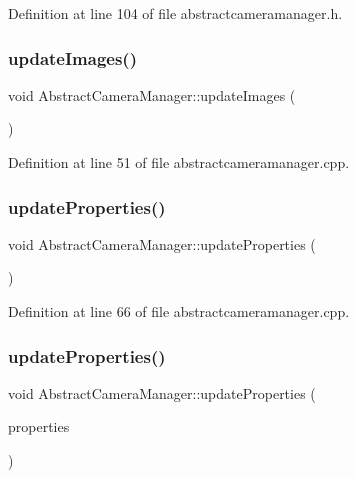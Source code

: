 Definition at line 104 of file abstractcameramanager.\+h.

\mbox{\label{class_abstract_camera_manager_a336e5cf760314194c1baf1234b87b247}} 
\subsubsection{\texorpdfstring{updateImages()}{updateImages()}}
{\footnotesize\ttfamily void Abstract\+Camera\+Manager\+::update\+Images (\begin{DoxyParamCaption}{ }\end{DoxyParamCaption})}



Definition at line 51 of file abstractcameramanager.\+cpp.

\mbox{\label{class_abstract_camera_manager_a518b8dd27c032030ff23930488da0a52}} 
\subsubsection{\texorpdfstring{updateProperties()}{updateProperties()}\hspace{0.1cm}{\footnotesize\ttfamily [1/2]}}
{\footnotesize\ttfamily void Abstract\+Camera\+Manager\+::update\+Properties (\begin{DoxyParamCaption}{ }\end{DoxyParamCaption})}



Definition at line 66 of file abstractcameramanager.\+cpp.

\mbox{\label{class_abstract_camera_manager_aa9e2342648ea4b4683885a3f5658fd91}} 
\subsubsection{\texorpdfstring{updateProperties()}{updateProperties()}\hspace{0.1cm}{\footnotesize\ttfamily [2/2]}}
{\footnotesize\ttfamily void Abstract\+Camera\+Manager\+::update\+Properties (\begin{DoxyParamCaption}\item[{std\+::vector$<$ \mbox{\hyperlink{class_camera_manager_1_1_camera_property}{Camera\+Manager\+::\+Camera\+Property}} $>$ \&}]{properties }\end{DoxyParamCaption})}



